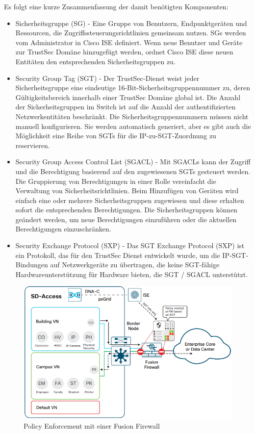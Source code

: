 Es folgt eine kurze Zusammenfassung der damit benötigten Komponenten:
\begin{itemize}
	\item Sicherheitsgruppe (SG) - Eine Gruppe von Benutzern, Endpunktgeräten und Res\-sour\-cen, die Zugriffssteuerungsrichtlinien gemeinsam nutzen. SGs werden vom Administrator in Cisco ISE definiert. Wenn neue Benutzer und Geräte zur TrustSec Domäne hinzugefügt werden, ordnet Cisco ISE diese neuen Entitäten den entsprechenden Sicherheitsgruppen zu.
	\item Security Group Tag (SGT) - Der TrustSec-Dienst weist jeder Sicherheitsgruppe eine eindeutige 16-Bit-Sicherheitsgruppennummer zu, deren Gültigkeitsbereich innerhalb einer TrustSec Domäne global ist. Die Anzahl der Sicherheitsgruppen im Switch ist auf die Anzahl der authentifizierten Netzwerkentitäten beschränkt. Die Sicherheitsgruppennummern müssen nicht manuell konfigurieren. Sie werden automatisch generiert, aber es gibt auch die Möglichkeit eine Reihe von SGTs für die IP-zu-SGT-Zuordnung zu reservieren.
	\item Security Group Access Control List (SGACL) - Mit SGACLs kann der Zugriff und die Berechtigung basierend auf den zugewiesenen SGTs gesteuert werden. Die Gruppierung von Berechtigungen in einer Rolle vereinfacht die Verwaltung von Sicherheitsrichtlinien. Beim Hinzufügen von Geräten wird einfach eine oder mehrere Sicherheitsgruppen zugewiesen und diese erhalten sofort die entsprechenden Berechtigungen. Die Sicherheitsgruppen können geändert werden, um neue Berechtigungen einzuführen oder die aktuellen Berechtigungen einzuschränken.
	\item Security Exchange Protocol (SXP) - Das SGT Exchange Protocol (SXP) ist ein Protokoll, das für den TrustSec Dienst entwickelt wurde, um die IP-SGT-Bindungen auf Netzwerkgeräte zu übertragen, die keine SGT-fähige Hardwareunterstützung für Hardware bieten, die SGT / SGACL unterstützt.
\end{itemize}

\begin{figure}[H]
	\centering
	\includegraphics[width=1\linewidth]{img/Absicherung/SGT-FusionFirewall}
	\caption{Policy Enforcement mit einer Fusion Firewall}
	\label{fig:Policy Enforcement mit einer Fusion Firewall}
\end{figure}

